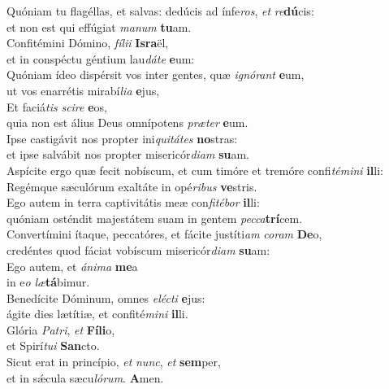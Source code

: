 \evenverse Quóniam tu flagéllas, et salvas: dedúcis ad ínfe\textit{ros}, \textit{et} \textit{re}\textbf{dú}cis:~\*\\
\evenverse et non est qui effúgiat \textit{ma}\textit{num} \textbf{tu}am.\\
\oddverse Confitémini Dómino, \textit{fí}\textit{li}\textit{i} \textbf{Is}\textbf{ra}ël,~\*\\
\oddverse et in conspéctu géntium lau\textit{dá}\textit{te} \textbf{e}um:\\
\evenverse Quóniam ídeo dispérsit vos inter gentes, quæ \textit{i}\textit{gnó}\textit{rant} \textbf{e}um,~\*\\
\evenverse ut vos enarrétis mirabí\textit{li}\textit{a} \textbf{e}jus,\\
\oddverse Et faciá\textit{tis} \textit{sci}\textit{re} \textbf{e}os,~\*\\
\oddverse quia non est álius Deus omnípotens \textit{præ}\textit{ter} \textbf{e}um.\\
\evenverse Ipse castigávit nos propter ini\textit{qui}\textit{tá}\textit{tes} \textbf{no}stras:~\*\\
\evenverse et ipse salvábit nos propter misericór\textit{di}\textit{am} \textbf{su}am.\\
\oddverse Aspícite ergo quæ fecit nobíscum, et cum timóre et tremóre confi\textit{té}\textit{mi}\textit{ni} \textbf{il}li:~\*\\
\oddverse Regémque sæculórum exaltáte in opé\textit{ri}\textit{bus} \textbf{ve}stris.\\
\evenverse Ego autem in terra captivitátis meæ con\textit{fi}\textit{té}\textit{bor} \textbf{il}li:~\*\\
\evenverse quóniam osténdit majestátem suam in gentem \textit{pec}\textit{ca}\textbf{trí}cem.\\
\oddverse Convertímini ítaque, peccatóres, et fácite justíti\textit{am} \textit{co}\textit{ram} \textbf{De}o,~\*\\
\oddverse credéntes quod fáciat vobíscum misericór\textit{di}\textit{am} \textbf{su}am:\\
\evenverse Ego autem, et \textit{á}\textit{ni}\textit{ma} \textbf{me}a~\*\\
\evenverse in e\textit{o} \textit{læ}\textbf{tá}bimur.\\
\oddverse Benedícite Dóminum, omnes \textit{e}\textit{lé}\textit{cti} \textbf{e}jus:~\*\\
\oddverse ágite dies lætítiæ, et confité\textit{mi}\textit{ni} \textbf{il}li.\\
\evenverse Glória \textit{Pa}\textit{tri}, \textit{et} \textbf{Fí}\textbf{li}o,~\*\\
\evenverse et Spirí\textit{tu}\textit{i} \textbf{San}cto.\\
\oddverse Sicut erat in princípio, \textit{et} \textit{nunc}, \textit{et} \textbf{sem}per,~\*\\
\oddverse et in sǽcula sæcu\textit{ló}\textit{rum}. \textbf{A}men.\\
